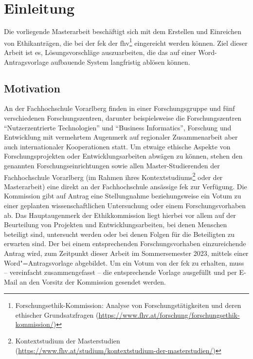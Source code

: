 \documentclass[a4paper,12pt,twoside]{scrreprt}
\begin{document}
\cleardoublepage
{}

\chapter{Einleitung}
\label{chap:einleitung}

Die vorliegende Masterarbeit beschäftigt sich mit dem Erstellen und Einreichen von Ethikanträgen, die bei der \ac{fek} der \ac{fhv}\footnote{Forschungsethik-Kommission: Analyse von Forschungstätigkeiten und deren ethischer Grundsatzfragen (\url{https://www.fhv.at/forschung/forschungsethik-kommission/})} eingereicht werden können. Ziel dieser Arbeit ist es, Lösungsvorschläge auszuarbeiten, die das auf einer Word-Antragsvorlage aufbauende System langfristig ablösen können.

\section{Motivation}
\label{sec:motivation}

An der Fachhochschule Vorarlberg finden in einer Forschungsgruppe und fünf verschiedenen Forschungszentren, darunter beispielsweise die Forschungszentren \enquote{Nutzerzentrierte Technologien} und \enquote{Business Informatics}, Forschung und Entwicklung mit vermehrtem Augenmerk auf regionaler Zusammenarbeit aber auch internationaler Kooperationen statt. \cite{fachhochschule_vorarlberg_gmbh_forschung_2021} Um etwaige ethische Aspekte von Forschungsprojekten oder Entwicklungsarbeiten abwägen zu können, stehen den genannten Forschungseinrichtungen sowie allen Master-Studierenden der Fachhochschule Vorarlberg (im Rahmen ihres Kontextstudiums\footnote{Kontextstudium der Masterstudien (\url{https://www.fhv.at/studium/kontextstudium-der-masterstudien/})} oder der Masterarbeit) eine direkt an der Fachhochschule ansässige \acl{fek} zur Verfügung. Die Kommission gibt auf Antrag eine Stellungnahme beziehungsweise ein Votum zu einer geplanten wissenschaftlichen Untersuchung oder einem Forschungsvorhaben ab. Das Hauptaugenmerk der Ethikkommission liegt hierbei vor allem auf der Beurteilung von Projekten und Entwicklungsarbeiten, bei denen Menschen beteiligt sind, untersucht werden oder bei denen Folgen für die Beteiligten zu erwarten sind. Der bei einem entsprechenden Forschungsvorhaben einzureichende Antrag wird, zum Zeitpunkt dieser Arbeit im Sommersemester 2023, mittels einer Word"=Antragsvorlage abgebildet. Um ein Votum von der \acl{fek} zu erhalten, muss -- vereinfacht zusammengefasst -- die entsprechende Vorlage ausgefüllt und per E-Mail an den Vorsitz der Kommission gesendet werden. \cite{fachhochschule_vorarlberg_gmbh_forschungsethik-kommission_2021}
\end{document}
